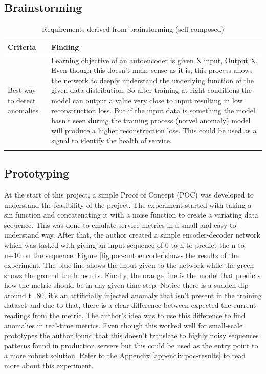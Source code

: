 
\subsection{Brainstorming}

\begin{longtable}{|p{50mm}|p{105mm}|}
    \hline
    \textbf{Criteria} &
    \textbf{Finding} \\ \hline

    Best way to detect anomalies &
    Learning objective of an autoencoder is given X input, Output X. Even though this doesn’t make sense as it is, this process allows the network to deeply understand the underlying function of the given data distribution. So after training at right conditions the model can output a value very close to input resulting in low reconstruction loss. But if the input data is something the model hasn’t seen during the training process (norvel anomaly) model will produce a higher reconstruction loss. This could be used as a signal to identify the health of service. \\ \hline

    \caption{Requirements derived from brainstorming (self-composed)}
\end{longtable}

\subsection{Prototyping}

At the start of this project, a simple Proof of Concept (POC) was developed to understand the feasibility of the project. The experiment started with taking a sin function and concatenating it with a noise function to create a variating data sequence. This was done to emulate service metrics in a small and easy-to-understand way. After that, the author created a simple encoder-decoder network which was tasked with giving an input sequence of 0 to n to predict the n to n+10 on the sequence. Figure \ref{fig:poc-autoencoder}shows the results of the experiment. The blue line shows the input given to the network while the green shows the ground truth results. Finally, the orange line is the model that predicts how the metric should be in any given time step. Notice there is a sudden dip around t=80, it's an artificially injected anomaly that isn't present in the training dataset and due to that, there is a clear difference between expected the current readings from the metric. The author's idea was to use this difference to find anomalies in real-time metrics. Even though this worked well for small-scale prototypes the author found that this doesn't translate to highly noisy sequences patterns found in production servers but this could be used as the entry point to a more robust solution. Refer to the Appendix \ref{appendix:poc-results} to read more about this experiment.

